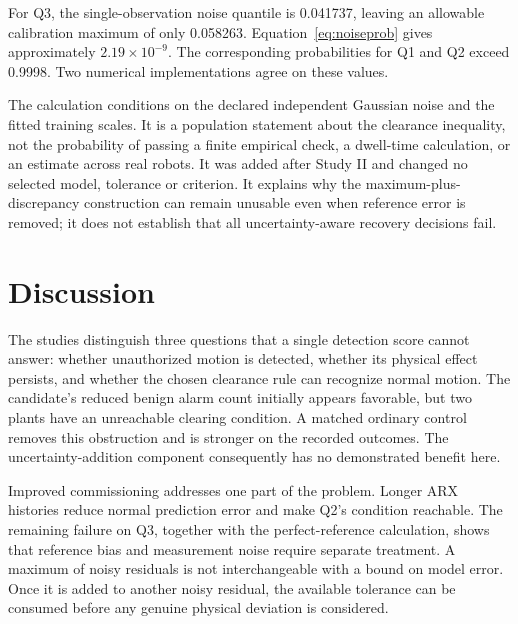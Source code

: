 \documentclass[11pt]{article}
\begin{document}
\begin{table}[htbp]\centering\small
\caption{Conditional perfect-reference diagnostic with $N=5{,}500$, $\delta=0.1$ and $\gamma=0.95$. The final column is the probability that a noise-only calibration maximum leaves enough margin for 95\% population feasibility.}\label{tab:noise}

\end{table}

For Q3, the single-observation noise quantile is 0.041737, leaving an allowable calibration maximum of only 0.058263. Equation~\ref{eq:noiseprob} gives approximately $2.19\times10^{-9}$. The corresponding probabilities for Q1 and Q2 exceed 0.9998. Two numerical implementations agree on these values.

The calculation conditions on the declared independent Gaussian noise and the fitted training scales. It is a population statement about the clearance inequality, not the probability of passing a finite empirical check, a dwell-time calculation, or an estimate across real robots. It was added after Study II and changed no selected model, tolerance or criterion. It explains why the maximum-plus-discrepancy construction can remain unusable even when reference error is removed; it does not establish that all uncertainty-aware recovery decisions fail.

\section{Discussion}
The studies distinguish three questions that a single detection score cannot answer: whether unauthorized motion is detected, whether its physical effect persists, and whether the chosen clearance rule can recognize normal motion. The candidate's reduced benign alarm count initially appears favorable, but two plants have an unreachable clearing condition. A matched ordinary control removes this obstruction and is stronger on the recorded outcomes. The uncertainty-addition component consequently has no demonstrated benefit here.

Improved commissioning addresses one part of the problem. Longer ARX histories reduce normal prediction error and make Q2's condition reachable. The remaining failure on Q3, together with the perfect-reference calculation, shows that reference bias and measurement noise require separate treatment. A maximum of noisy residuals is not interchangeable with a bound on model error. Once it is added to another noisy residual, the available tolerance can be consumed before any genuine physical deviation is considered.
\end{document}
